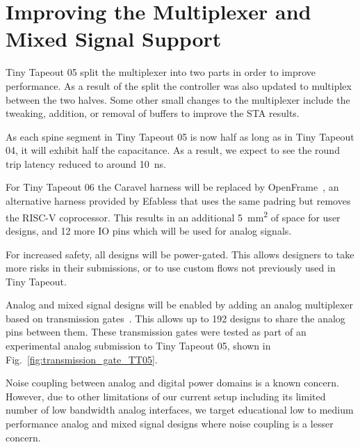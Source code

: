 \section{Improving the Multiplexer and Mixed Signal Support}
\label{sec:improving}

Tiny Tapeout 05 split the multiplexer into two parts in order to improve performance. As a result of the split the controller was also updated to multiplex between the two halves.
Some other small changes to the multiplexer include the tweaking, addition, or removal of buffers to improve the STA results.

As each spine segment in Tiny Tapeout 05 is now half as long as in Tiny Tapeout 04, it will exhibit half the capacitance. As a result, we expect to see the round trip latency reduced to around \qty{10}{\ns}.

For Tiny Tapeout 06 the Caravel harness will be replaced by OpenFrame~\cite{openframe}, an alternative harness provided by Efabless that uses the same padring but removes the RISC-V coprocessor.
This results in an additional \qty{5}{\mm\squared} of space for user designs, and 12 more IO pins which will be used for analog signals.

For increased safety, all designs will be power-gated. This allows designers to take more risks in their submissions, or to use custom flows not previously used in Tiny Tapeout.

Analog and mixed signal designs will be enabled by adding an analog multiplexer based on transmission gates~\cite{transmissiongates}. 
This allows up to 192 designs to share the analog pins between them.
These transmission gates were tested as part of an experimental analog submission to Tiny Tapeout 05, shown in Fig.~\ref{fig:transmission_gate_TT05}.

Noise coupling between analog and digital power domains is a known concern. However, due to other limitations of our current setup including its limited number of low bandwidth analog interfaces, we target educational low to medium performance analog and mixed signal designs where noise coupling is a lesser concern.

